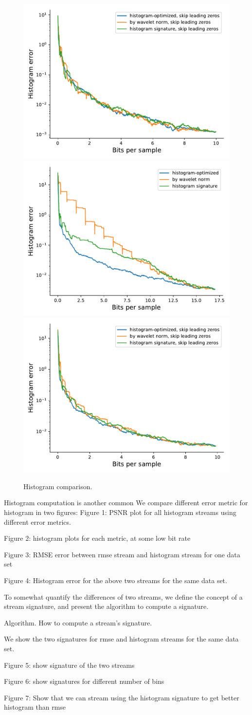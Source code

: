 \begin{figure}
	{\includegraphics[width=0.48\linewidth]{img/histogram/skip-leading-zeros/turbulence-histogram.pdf}}
	{\includegraphics[width=0.48\linewidth]{img/histogram/enzo-u-histogram.pdf}}
	{\includegraphics[width=0.48\linewidth]{img/histogram/skip-leading-zeros/enzo-u-histogram.pdf}}
	\caption{Histogram comparison.}
	\label{fig:histogram-comparison}
\end{figure}

Histogram computation is another common 
We compare different error metric for histogram in two figures:
Figure 1: PSNR plot for all histogram streams using different error metrics.

Figure 2: histogram plots for each metric, at some low bit rate

Figure 3: RMSE error between rmse stream and histogram stream for one data set

Figure 4: Histogram error for the  above two streams for the same data set.

To somewhat quantify the differences of two streams, we define the concept of a stream signature, and present the algorithm to compute a signature.

Algorithm. How to compute a stream's signature.

We show the two signatures for rmse and histogram streams for the same data set.

Figure 5: show signature of the two streams

Figure 6: show signatures for different number of bins

Figure 7: Show that we can stream using the histogram signature to get better histogram than rmse